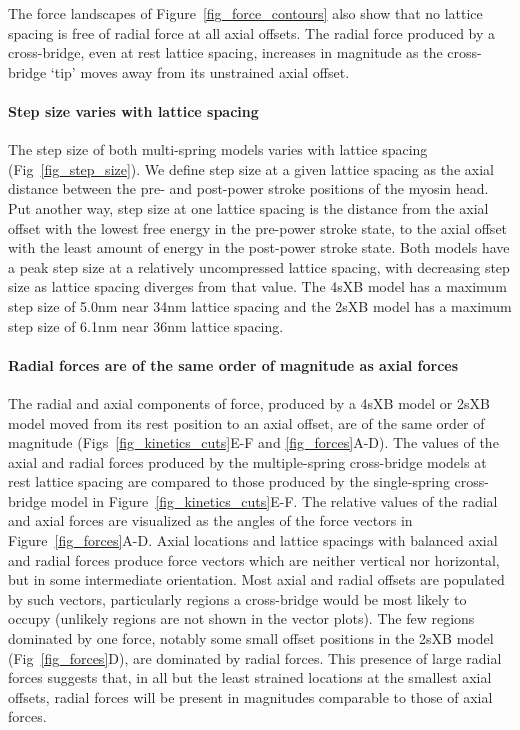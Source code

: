 \documentclass[10pt]{article}
\begin{document}
The force landscapes of Figure~\ref{fig_force_contours} also show that no lattice spacing is free of radial force at all axial offsets.  
The radial force produced by a cross-bridge, even at rest lattice spacing, increases in magnitude as the cross-bridge `tip' moves away from its unstrained axial offset. 

\paragraph{Step size varies with lattice spacing} %
The step size of both multi-spring models varies with lattice spacing (Fig~\ref{fig_step_size}). 
We define step size at a given lattice spacing as the axial distance between the pre- and post-power stroke positions of the myosin head. 
Put another way, step size at one lattice spacing is the distance from the axial offset with the lowest free energy in the pre-power stroke state, to the axial offset with the least amount of energy in the post-power stroke state. 
Both models have a peak step size at a relatively uncompressed lattice spacing, with decreasing step size as lattice spacing diverges from that value. 
The 4sXB model has a maximum step size of 5.0nm near 34nm lattice spacing and the 2sXB model has a maximum step size of 6.1nm near 36nm lattice spacing. 

\paragraph{Radial forces are of the same order of magnitude as axial forces} %
The radial and axial components of force, produced by a 4sXB model or 2sXB model moved from its rest position to an axial offset, are of the same order of magnitude (Figs~\ref{fig_kinetics_cuts}E-F and \ref{fig_forces}A-D). 
The values of the axial and radial forces produced by the multiple-spring cross-bridge models at rest lattice spacing are compared to those produced by the single-spring cross-bridge model in Figure~\ref{fig_kinetics_cuts}E-F.
The relative values of the radial and axial forces are visualized as the angles of the force vectors in Figure~\ref{fig_forces}A-D. 
Axial locations and lattice spacings with balanced axial and radial forces produce force vectors which are neither vertical nor horizontal, but in some intermediate orientation.
Most axial and radial offsets are populated by such vectors, particularly regions a cross-bridge would be most likely to occupy (unlikely regions are not shown in the vector plots). 
The few regions dominated by one force, notably some small offset positions in the 2sXB model (Fig~\ref{fig_forces}D), are dominated by radial forces.
This presence of large radial forces suggests that, in all but the least strained locations at the smallest axial offsets, radial forces will be present in magnitudes comparable to those of axial forces. 
\end{document}
